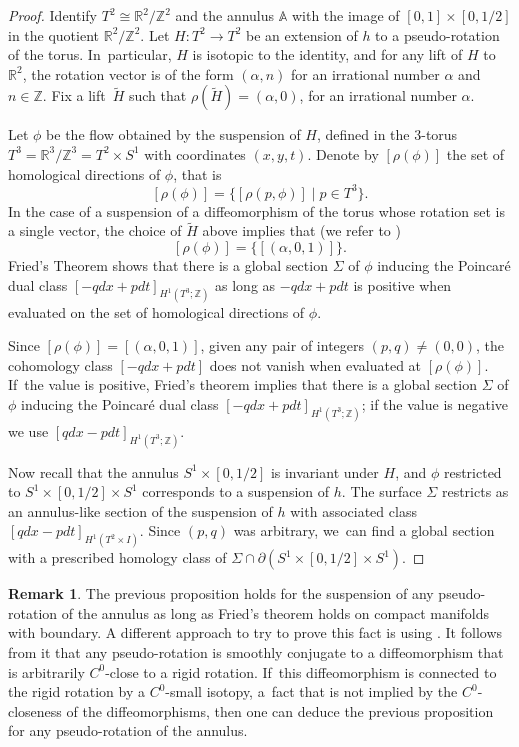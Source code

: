 \documentclass[11pt]{article}
\theoremstyle{definition}
\newtheorem{Remark}[theorem]{Remark}
\begin{document}
\begin{proof}
Identify $T^2\cong \mathbb{R}^2/\mathbb{Z}^2$ and the annulus $\mathbb{A}$ with the image of $[0,1]\times [0,1/2]$ in the quotient $\mathbb{R}^2/\mathbb{Z}^2$. Let $H: T^2 \to T^2$
be an extension of $h$ to a pseudo-rotation of the torus. In~particular, $H$ is isotopic to the identity, and for any lift of $H$ to $\mathbb{R}^2$, the rotation vector is of the form $(\alpha,n)$ for an irrational number $\alpha$ and $n\in \mathbb{Z}$. Fix a lift~$\widetilde H$ such that $\rho(\widetilde H)=(\alpha,0)$, for an irrational number $\alpha$.

Let $\phi$ be the flow obtained by the suspension of $H$, defined in the 3-torus $T^3=\mathbb{R}^3/\mathbb{Z}^3=T^2\times S^1$ with coordinates $(x,y,t)$.
Denote by $[\rho(\phi)]$ the set of homological directions of $\phi$, that is
\[
[\rho(\phi)]=\{ [\rho(p,\phi)]\mid p\in T^3\}.
\]
In the case of a suspension of a diffeomorphism of the torus whose rotation set is a single vector, the choice of $\widetilde H$ above implies that (we refer to \cite[Eq.\,2.2]{K1})
\[
[\rho(\phi)]=\{[(\alpha,0,1)]\}.
\]
Fried's Theorem \cite[Th.\,D]{Fr} shows that there is a global section $\Sigma$ of $\phi$ inducing the Poincaré dual class $[-qdx+pdt]_{H^1(T^3;\mathbb{Z})}$ as long as $-qdx+pdt$ is positive when evaluated on the set of homological directions of $\phi$.

{Since $[\rho(\phi)]=[(\alpha,0,1)]$}, given any pair of integers $(p,q)\neq (0,0)$, the cohomology class $[-qdx+pdt]$ does not vanish when evaluated at $[\rho(\phi)]$. If~the value is positive, Fried's theorem implies that there is a global section $\Sigma$ of $\phi$ inducing the Poincaré dual class $[-qdx+pdt]_{H^1({T}^3;\mathbb{Z})}$; if the value is negative we use $[qdx-pdt]_{H^1(T^3;\mathbb{Z})}$.

Now recall that the annulus $S^1\times [0,1/2]$ is invariant under $H$, and $\phi$ restricted to $S^1\times[0,1/2]\times S^1$ corresponds to a suspension of $h$. The surface $\Sigma$ restricts as an annulus-like section of the suspension of $h$ with associated class $[qdx-pdt]_{H^1(T^2\times I)}$. Since $(p,q)$ was arbitrary, we~can find a global section with a prescribed homology class of $\Sigma\cap \partial (S^1\times [0,1/2] \times S^1)$.
\end{proof}

\begin{Remark}
The previous proposition holds for the suspension of any pseudo-rotation of the annulus as long as Fried's theorem holds on compact manifolds with boundary. A different approach to try to prove this fact is using \cite[Prop.\,5.1]{BCLP}. It follows from it that any pseudo-rotation is smoothly conjugate to a diffeomorphism that is arbitrarily $C^0$-close to a rigid rotation. If~this diffeomorphism is connected to the rigid rotation by a $C^0$-small isotopy, a~fact that is not implied by the $C^0$-closeness of the diffeomorphisms, then one can deduce the previous proposition for any pseudo-rotation of the annulus.
\end{Remark}
\end{document}
